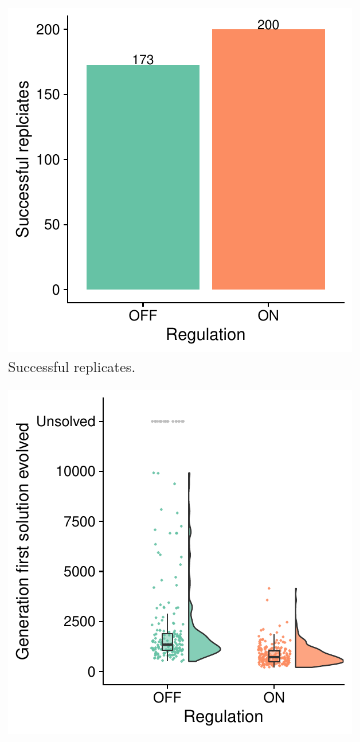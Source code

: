
\begin{figure}[ht]
\centering

\begin{subfigure}[b]{0.45\textwidth}
    \centering
    \includegraphics[width=\linewidth]{chapters/05-tag-based-genetic-regulation/media/context-signal-solution-counts.pdf}
    \caption{\small Successful replicates.}
    \label{chapter:tag-based-regulation:subfig:context-signal-solution-counts}
\end{subfigure}
\hfill
\begin{subfigure}[b]{0.45\textwidth}
    \centering
    \includegraphics[width=\textwidth]{chapters/05-tag-based-genetic-regulation/media/context-signal-solve-time-cloud.pdf}

\end{subfigure}
\end{figure}
